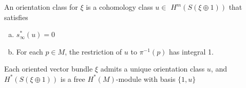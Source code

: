 \begin{definition}\label{definition:21-1}
  An orientation class for $\xi$ is a cohomology class $u \in$  $H^m( {S( {\xi  \oplus  1}) })$ that satisfies
  \begin{enumerate}[(a)]
    \item ${s}_{\infty }^*( u)  = 0$
    \item For each $p \in  M$, the restriction of $u$ to ${\pi }^{-1}( p)$ has integral 1.
  \end{enumerate}
\end{definition}

\begin{theorem}\label{theorem:21-2}
  Each oriented vector bundle $\xi$ admits a unique orientation class $u$, and ${H}^*( {S( {\xi  \oplus  1}) })$ 
  is a free ${H}^*( M)$-module with basis $\{ 1,u\}$
\end{theorem}


